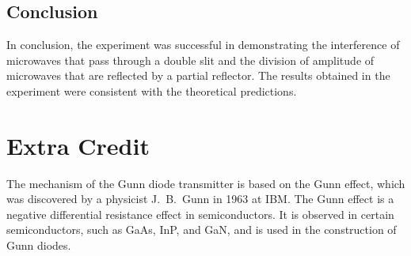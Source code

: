 \documentclass[10pt]{article}
\begin{document}
\subsection*{Conclusion} 
In conclusion, the experiment was successful in demonstrating the interference of microwaves that pass through a double slit and the division of amplitude of microwaves that are reflected by a partial reflector. The results obtained in the experiment were consistent with the theoretical predictions.
\section{Extra Credit}

The mechanism of the Gunn diode transmitter is based on the Gunn effect, which was discovered by a physicist J.~B.~Gunn in 1963 at IBM. The Gunn effect is a negative differential resistance effect in semiconductors. It is observed in certain semiconductors, such as GaAs, InP, and GaN, and is used in the construction of Gunn diodes.

\end{document}
